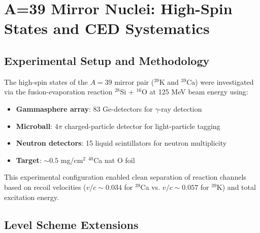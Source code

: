 \section{A=39 Mirror Nuclei: High-Spin States and CED Systematics}

\subsection{Experimental Setup and Methodology}

The high-spin states of the $A=39$ mirror pair ($^{39}$K and $^{39}$Ca) were investigated via the fusion-evaporation reaction $^{28}$Si + $^{16}$O at 125 MeV beam energy using:
\begin{itemize}
    \item \textbf{Gammasphere array}: 83 Ge-detectors for $\gamma$-ray detection
    \item \textbf{Microball}: $4\pi$ charged-particle detector for light-particle tagging
    \item \textbf{Neutron detectors}: 15 liquid scintillators for neutron multiplicity
    \item \textbf{Target}: $\sim 0.5$ mg/cm$^2$ $^{40}$Ca nat O foil
\end{itemize}

This experimental configuration enabled clean separation of reaction channels based on recoil velocities ($v/c \sim 0.034$ for $^{39}$Ca vs. $v/c \sim 0.057$ for $^{39}$K) and total excitation energy.

\subsection{Level Scheme Extensions}

